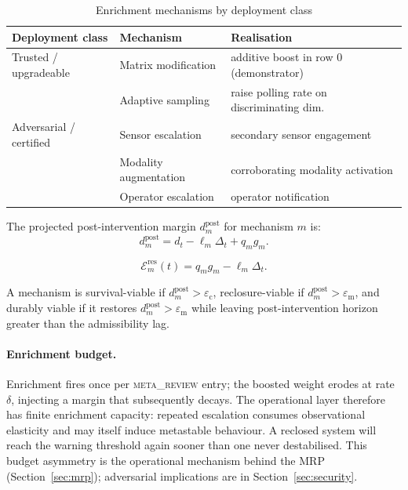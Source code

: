 \documentclass{llncs}
\newcommand{\ecollapse}{\varepsilon_{\mathrm{c}}}
\newcommand{\emeta}{\varepsilon_{\mathrm{m}}}
\newcommand{\st}[1]{\textup{\textsc{#1}}}
\begin{document}
\begin{table}[H]
\centering
\caption{Enrichment mechanisms by deployment class}
\label{tab:enrichment}
\small
\begin{tabular}{ll>{\raggedright\arraybackslash}p{.34\linewidth}}
\toprule
\textbf{Deployment class} & \textbf{Mechanism} & \textbf{Realisation} \\
\midrule
Trusted / upgradeable & Matrix modification & additive boost in row 0 (demonstrator) \\
                      & Adaptive sampling   & raise polling rate on discriminating dim.\ \\
\midrule
Adversarial / certified & Sensor escalation      & secondary sensor engagement \\
                        & Modality augmentation  & corroborating modality activation \\
                        & Operator escalation    & operator notification \\
\bottomrule
\end{tabular}
\end{table}

The projected post-intervention margin $d^{\mathrm{post}}_m$ for mechanism $m$ is:
\[
d^{\mathrm{post}}_m = d_t - \ell_m \Delta_t + q_m g_m .
\]

\[
\mathcal{E}^{\mathrm{res}}_m(t) = q_m g_m - \ell_m \Delta_t .
\]

A mechanism is survival-viable if $d^{\mathrm{post}}_m > \ecollapse$, reclosure-viable if $d^{\mathrm{post}}_m > \emeta$, and durably viable if it restores $d^{\mathrm{post}}_m > \emeta$ while leaving post-intervention horizon greater than the admissibility lag.

\paragraph{Enrichment budget.}
Enrichment fires once per \st{meta\_review} entry; the boosted weight
erodes at rate $\delta$, injecting a margin that subsequently decays.
The operational layer therefore has finite enrichment capacity: repeated
escalation consumes observational elasticity and may itself induce
metastable behaviour. A reclosed system will reach the warning threshold
again sooner than one never destabilised. This budget asymmetry is the
operational mechanism behind the MRP (Section~\ref{sec:mrp}); adversarial
implications are in Section~\ref{sec:security}.

\end{document}
